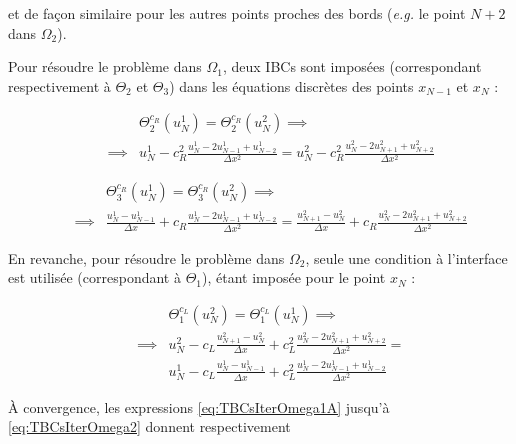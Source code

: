 \noindent et de façon similaire pour les autres points proches des bords (\emph{e.g.} le point $N+2$ dans $\Omega_2$).

\indent Pour résoudre le problème dans $\Omega_1$, deux IBCs sont imposées (correspondant respectivement à $\Theta_2$ et $\Theta_3$) dans les équations discrètes des points $x_{N-1}$ et $x_N$ : 

\begin{equation}
	\begin{aligned}
    \label{eq:TBCsIterOmega1A}
    && 				&\Theta_2^{c_R}(u_N^1) = \Theta_2^{c_R}(u_N^2) \implies \\ 
    && \implies & u_N^1 - c_R^2 \frac{u_N^1 - 2u_{N-1}^1 + u_{N-2}^1}{\Delta x^2} = u_N^2 - c_R^2 \frac{u_N^2 - 2u_{N+1}^2 + u_{N+2}^2}{\Delta x^2} 
    \end{aligned}
\end{equation}

\begin{equation}
	\begin{aligned}
    \label{eq:TBCsIterOmega1B}
    && 			   & \Theta_3^{c_R}(u_N^1) = \Theta_3^{c_R}(u_N^2) \implies \\
    && \implies & \frac{u_N^1 - u_{N-1}^1}{\Delta x} + c_R \frac{u_N^1 - 2u_{N-1}^1 + u_{N-2}^1}{\Delta x^2} = \frac{u_{N+1}^2 - u_{N}^2}{\Delta x} + c_R \frac{u_N^2 - 2u_{N+1}^2 + u_{N+2}^2}{\Delta x^2}
    \end{aligned}
\end{equation}

\indent En revanche, pour résoudre le problème dans $\Omega_2$, seule une condition à l'interface est utilisée (correspondant à $\Theta_1$), étant imposée pour le point $x_N$ : 

\begin{equation}
	\begin{aligned}
    \label{eq:TBCsIterOmega2}
    && 				&\Theta_1^{c_L}(u_N^2) = \Theta_1^{c_L}(u_N^1) \implies \\ 
    && \implies & u_N^2 - c_L \frac{u_{N+1}^2 - u_{N}^2}{\Delta x} + c_L^2 \frac{u_N^2 - 2u_{N+1}^2 + u_{N+2}^2}{\Delta x^2}  =\\
    && 				& u_N^1 - c_L \frac{u_{N}^1 - u_{N-1}^1}{\Delta x} + c_L^2 \frac{u_N^1 - 2u_{N-1}^1 + u_{N-2}^1}{\Delta x^2}
    \end{aligned}
\end{equation}

\indent À convergence, les expressions \eqref{eq:TBCsIterOmega1A} jusqu'à \eqref{eq:TBCsIterOmega2} donnent respectivement 


